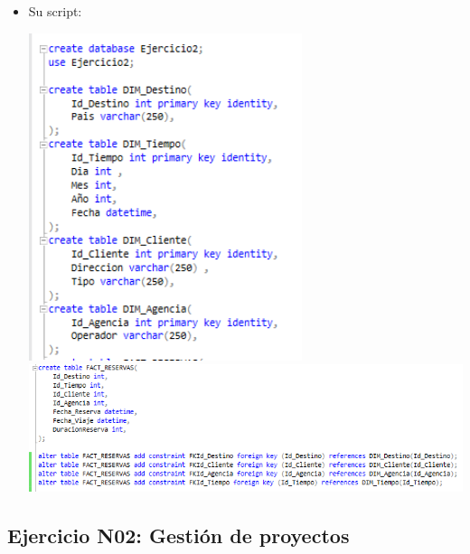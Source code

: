 \documentclass[12pt,letterpaper]{article}
\begin{document}
\begin{itemize}
\begin{center}
	\end{center}
\item Su script:
	\begin{center}
	\includegraphics[width=8cm]{./Imagenes/s2-1}
	\includegraphics[width=14cm]{./Imagenes/s2-2}
	\end{center}

\end{itemize}

\subsection{ Ejercicio N02: Gestión de proyectos}
\end{document}
